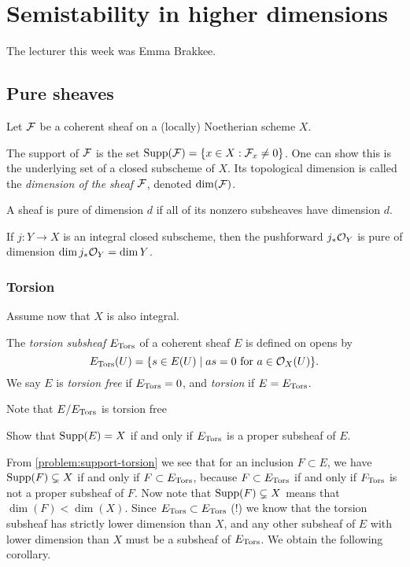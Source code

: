\chapter{Semistability in higher dimensions}
The lecturer this week was Emma Brakkee.
\section{Pure sheaves}

Let $\mathcal{F}$ be a coherent sheaf on a (locally) Noetherian scheme $X$. 

\begin{definition}
	The support of $\mathcal{F}$ is the set $\operatorname{Supp}(\mathcal{F}) = \{x \in X: \mathcal{F}_x \neq 0\}$.
	One can show this is the underlying set of a closed subscheme of $X$. Its topological dimension is called the \emph{dimension of the sheaf} $\mathcal{F}$, denoted $\dim(\mathcal{F})$.
\end{definition}

\begin{definition}
	A sheaf is pure of dimension $d$ if all of its nonzero subsheaves have dimension $d$. 
\end{definition}

\begin{problem}
	If $j: Y \to X$ is an integral closed subscheme, then the pushforward $j_* \mathcal{O}_Y$ is pure of dimension $\dim j_*\mathcal{O}_Y = \dim Y$. 
\end{problem}

\subsection{Torsion}
Assume now that $X$ is also integral. 

\begin{definition}
	The \emph{torsion subsheaf} $E_{\operatorname{Tors}}$ 
	of a coherent sheaf $E$ is defined on opens by \[E_{\operatorname{Tors}}(U) = \{s \in E(U) \mid as = 0 \text{ for } a \in \mathcal{O}_X(U)\}.\] We say $E$ is \emph{torsion free} if $E_{\operatorname{Tors}} = 0$, and \emph{torsion} if $E = E_{\operatorname{Tors}}$. 
\end{definition}
Note that $E/E_{\operatorname{Tors}}$ is torsion free  

\begin{problem}\label{problem:support-torsion}
	Show that $\operatorname{Supp}(E) = X$ if and only if $E_{\operatorname{Tors}}$ is a proper subsheaf of $E$. 
\end{problem}

From \cref{problem:support-torsion} we see that for an inclusion $F \subset E$, we have $\operatorname{Supp}(F) \subsetneq X$ if and only if $F \subset E_{\operatorname{Tors}}$, because $F \subset E_{\operatorname{Tors}}$ if and only if $F_{\operatorname{Tors}}$ is not a proper subsheaf of $F$. Now note that $\operatorname{Supp}(F) \subsetneq X$ means that $\dim(F) < \dim(X)$. Since $E_{\operatorname{Tors}} \subset E_{\operatorname{Tors}}$ (!) we know that the torsion subsheaf has strictly lower dimension than $X$, and any other subsheaf of $E$ with lower dimension than $X$ must be a subsheaf of $E_{\operatorname{Tors}}$. We obtain the following corollary. 

